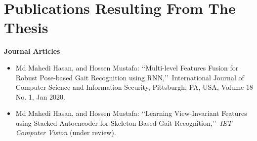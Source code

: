 \section{Publications Resulting From The Thesis}
\textbf{Journal Articles}

\begin{itemize}
\item Md Mahedi Hasan, and Hossen Mustafa: \lq\lq Multi-level Features Fusion for Robust Pose-based Gait Recognition
using RNN,\rq\rq~International Journal of Computer Science and Information Security, Pittsburgh, PA,
USA, Volume 18 No. 1, Jan 2020.

\item Md Mahedi Hasan, and Hossen Mustafa: \lq\lq Learning View-Invariant Features using Stacked Autoencoder for Skeleton-Based Gait Recognition,\rq\rq~\textit{IET Computer Vision} (under review).
\end{itemize}
